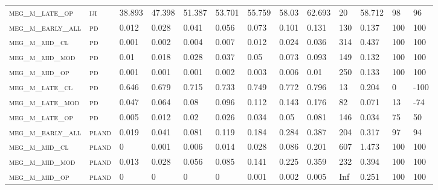 \begin{landscape}
\begin{center}
\begin{footnotesize}
\begin{longtable}{lllllllllllll}
\textsc{meg\_m\_late\_op  } & \textsc{iji       }   & 38.893   & 47.398   & 51.387   & 53.701   & 55.759   & 58.03    & 62.693   & 20     & 58.712        & 98            & 96              \\
\textsc{meg\_m\_early\_all} & \textsc{pd        }   & 0.012    & 0.028    & 0.041    & 0.056    & 0.073    & 0.101    & 0.131    & 130    & 0.137         & 100           & 100             \\
\textsc{meg\_m\_mid\_cl   } & \textsc{pd        }   & 0.001    & 0.002    & 0.004    & 0.007    & 0.012    & 0.024    & 0.036    & 314    & 0.437         & 100           & 100             \\
\textsc{meg\_m\_mid\_mod  } & \textsc{pd        }   & 0.01     & 0.018    & 0.028    & 0.037    & 0.05     & 0.073    & 0.093    & 149    & 0.132         & 100           & 100             \\
\textsc{meg\_m\_mid\_op   } & \textsc{pd        }   & 0.001    & 0.001    & 0.001    & 0.002    & 0.003    & 0.006    & 0.01     & 250    & 0.133         & 100           & 100             \\
\textsc{meg\_m\_late\_cl  } & \textsc{pd        }   & 0.646    & 0.679    & 0.715    & 0.733    & 0.749    & 0.772    & 0.796    & 13     & 0.204         & 0             & -100            \\
\textsc{meg\_m\_late\_mod } & \textsc{pd        }   & 0.047    & 0.064    & 0.08     & 0.096    & 0.112    & 0.143    & 0.176    & 82     & 0.071         & 13            & -74             \\
\textsc{meg\_m\_late\_op  } & \textsc{pd        }   & 0.005    & 0.012    & 0.02     & 0.026    & 0.034    & 0.05     & 0.081    & 146    & 0.034         & 75            & 50              \\
\textsc{meg\_m\_early\_all} & \textsc{pland     }   & 0.019    & 0.041    & 0.081    & 0.119    & 0.184    & 0.284    & 0.387    & 204    & 0.317         & 97            & 94              \\
\textsc{meg\_m\_mid\_cl   } & \textsc{pland     }   & 0        & 0.001    & 0.006    & 0.014    & 0.028    & 0.086    & 0.201    & 607    & 1.473         & 100           & 100             \\
\textsc{meg\_m\_mid\_mod  } & \textsc{pland     }   & 0.013    & 0.028    & 0.056    & 0.085    & 0.141    & 0.225    & 0.359    & 232    & 0.394         & 100           & 100             \\
\textsc{meg\_m\_mid\_op   } & \textsc{pland     }   & 0        & 0        & 0        & 0        & 0.001    & 0.002    & 0.005    & Inf    & 0.251         & 100           & 100             \\

\end{longtable}
\end{footnotesize}
\end{center}
\end{landscape}
